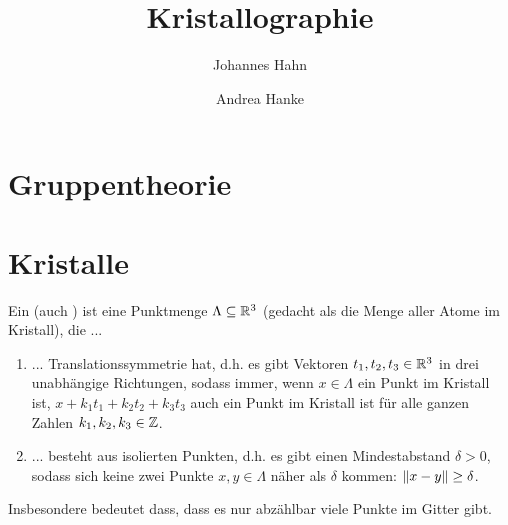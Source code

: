 \documentclass[fontsize=11pt,fleqn,a4paper]{scrartcl}
\title{Kristallographie}
\author{Johannes Hahn \and Andrea Hanke}
\begin{document}
\maketitle

\section{Gruppentheorie}

\section{Kristalle}

\begin{definition}[Kristalle]
Ein  (auch ) ist eine Punktmenge $\Lambda\subseteq\mathbb{R}^3$ (gedacht als die Menge aller Atome im Kristall), die ...
\begin{enumerate}
\item ... Translationssymmetrie hat, d.h. es gibt Vektoren $t_1,t_2,t_3\in\mathbb{R}^3$ in drei unabhängige Richtungen, sodass immer, wenn $x\in\Lambda$ ein Punkt im Kristall ist, $x+k_1 t_1+k_2t_2+k_3t_3$ auch ein Punkt im Kristall ist für alle ganzen Zahlen $k_1,k_2,k_3\in\mathbb{Z}$.
\item ... besteht aus isolierten Punkten, d.h. es gibt einen Mindestabstand $\delta>0$, sodass sich keine zwei Punkte $x,y\in\Lambda$ näher als $\delta$ kommen: $\lVert x-y\rVert\geq\delta$.
\end{enumerate}
\end{definition}

\begin{remark}
Insbesondere bedeutet dass, dass es nur abzählbar viele Punkte im Gitter gibt.
\end{remark}
\end{document}
